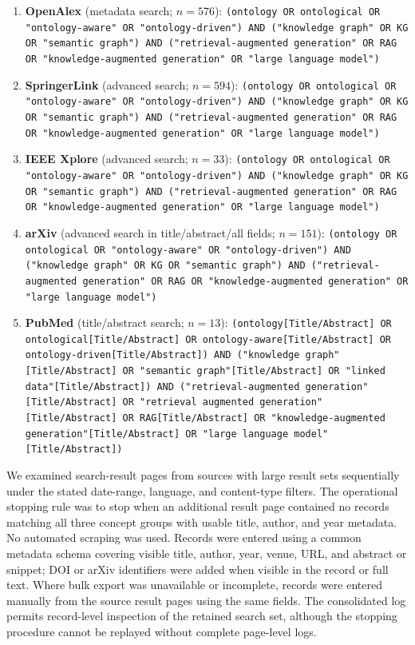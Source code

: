 \begin{enumerate}
    \item \textbf{OpenAlex} (metadata search; $n=576$): \texttt{(ontology OR ontological OR "ontology-aware" OR "ontology-driven") AND ("knowledge graph" OR KG OR "semantic graph") AND ("retrieval-augmented generation" OR RAG OR "knowledge-augmented generation" OR "large language model")}


    \item \textbf{SpringerLink} (advanced search; $n=594$): \texttt{(ontology OR ontological OR "ontology-aware" OR "ontology-driven") AND ("knowledge graph" OR KG OR "semantic graph") AND ("retrieval-augmented generation" OR RAG OR "knowledge-augmented generation" OR "large language model")}

    \item \textbf{IEEE Xplore} (advanced search; $n=33$): \texttt{(ontology OR ontological OR "ontology-aware" OR "ontology-driven") AND ("knowledge graph" OR KG OR "semantic graph") AND ("retrieval-augmented generation" OR RAG OR "knowledge-augmented generation" OR "large language model")}


    \item \textbf{arXiv} (advanced search in title/abstract/all fields; $n=151$): \texttt{(ontology OR ontological OR "ontology-aware" OR "ontology-driven") AND ("knowledge graph" OR KG OR "semantic graph") AND ("retrieval-augmented generation" OR RAG OR "knowledge-augmented generation" OR "large language model")}

    \item \textbf{PubMed} (title/abstract search; $n=13$): \texttt{(ontology[Title/Abstract] OR ontological[Title/Abstract] OR ontology-aware[Title/Abstract] OR ontology-driven[Title/Abstract]) AND ("knowledge graph"[Title/Abstract] OR "semantic graph"[Title/Abstract] OR "linked data"[Title/Abstract]) AND ("retrieval-augmented generation"[Title/Abstract] OR "retrieval augmented generation"[Title/Abstract] OR RAG[Title/Abstract] OR "knowledge-augmented generation"[Title/Abstract] OR "large language model"[Title/Abstract])}
\end{enumerate}

We examined search-result pages from sources with large result sets sequentially under the stated date-range, language, and content-type filters. The operational stopping rule was to stop when an additional result page contained no records matching all three concept groups with usable title, author, and year metadata. No automated scraping was used. Records were entered using a common metadata schema covering visible title, author, year, venue, URL, and abstract or snippet; DOI or arXiv identifiers were added when visible in the record or full text. Where bulk export was unavailable or incomplete, records were entered manually from the source result pages using the same fields. The consolidated log permits record-level inspection of the retained search set, although the stopping procedure cannot be replayed without complete page-level logs.

